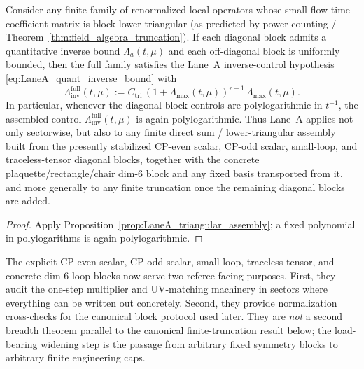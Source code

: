 \begin{corollary}\label{cor:LaneA_mixed_sector}
Consider any finite family of renormalized local operators whose small-flow-time coefficient matrix is block lower triangular
(as predicted by power counting / Theorem~\ref{thm:field_algebra_truncation}).
If each diagonal block admits a quantitative inverse bound $\Lambda_a(t,\mu)$ and each off-diagonal block is uniformly bounded,
then the full family satisfies the Lane~A inverse-control hypothesis \eqref{eq:LaneA_quant_inverse_bound} with
\[
\Lambda_{\mathrm{inv}}^{\mathrm{full}}(t,\mu)
:=
C_{\mathrm{tri}}\,(1+\Lambda_{\max}(t,\mu))^{r-1}\,\Lambda_{\max}(t,\mu).
\]
In particular, whenever the diagonal-block controls are polylogarithmic in $t^{-1}$, the assembled control
$\Lambda_{\mathrm{inv}}^{\mathrm{full}}(t,\mu)$ is again polylogarithmic.
Thus Lane~A applies not only sectorwise, but also to any finite direct sum / lower-triangular assembly built from the presently stabilized
CP-even scalar, CP-odd scalar, small-loop, and traceless-tensor diagonal blocks, together with the concrete plaquette/rectangle/chair dim-$6$ block and any fixed basis transported from it,
and more generally to any finite truncation once the remaining diagonal blocks are added.
\end{corollary}

\begin{proof}
Apply Proposition~\ref{prop:LaneA_triangular_assembly}; a fixed polynomial in polylogarithms is again polylogarithmic.
\end{proof}

\begin{remark}\label{rem:LaneA_sample_certificates}
The explicit CP-even scalar, CP-odd scalar, small-loop, traceless-tensor, and concrete dim-$6$ loop blocks now serve two referee-facing purposes.
First, they audit the one-step multiplier and UV-matching machinery in sectors where everything can be written out concretely.
Second, they provide normalization cross-checks for the canonical block protocol used later.
They are \emph{not} a second breadth theorem parallel to the canonical finite-truncation result below;
the load-bearing widening step is the passage from arbitrary fixed symmetry blocks to arbitrary finite engineering caps.
\end{remark}

